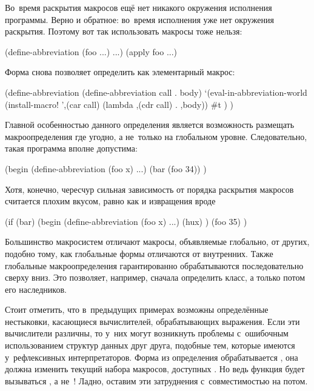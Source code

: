 Во~время раскрытия макросов ещё нет никакого окружения исполнения программы.
Верно и обратное: во~время исполнения уже нет окружения раскрытия. Поэтому вот
так использовать макросы тоже нельзя:

\begin{code:lisp}
(define-abbreviation (foo ...) ...)
(apply foo ...)
\end{code:lisp}

Форма  снова позволяет определить
 как элементарный макрос:

\begin{code:lisp}
(define-abbreviation (define-abbreviation call . body)
  `(eval-in-abbreviation-world
     (install-macro! ',(car call) (lambda ,(cdr call) . ,body))
     #t ) )
\end{code:lisp}

Главной особенностью данного определения является возможность размещать
макроопределения где угодно, а не~только на глобальном уровне. Следовательно,
такая программа вполне допустима:

\begin{code:lisp}
(begin (define-abbreviation (foo x) ...)
       (bar (foo 34)) )
\end{code:lisp}

Хотя, конечно, чересчур сильная зависимость от порядка раскрытия макросов
считается плохим вкусом, равно как и извращения вроде

\begin{code:lisp}
(if (bar) (begin (define-abbreviation (foo x) ...)
                 (hux) )
          (foo 35) )
\end{code:lisp}

Большинство макросистем отличают макросы, объявляемые глобально, от других,
подобно тому, как глобальные формы  отличаются от внутренних. Также
глобальные макроопределения гарантированно обрабатываются последовательно сверху
вниз. Это позволяет, например, сначала определить класс, а только потом его
наследников.

Стоит отметить, что в~предыдущих примерах возможны определённые нестыковки,
касающиеся вычислителей, обрабатывающих выражения. Если эти вычислители
различны, то у~них могут возникнуть проблемы с~ошибочным использованием
структур данных друг друга, подобные тем, которые имеются у~рефлексивных
интерпретаторов.  Форма  из
определения  обрабатывается , она
должна изменить текущий набора макросов, доступных . Но ведь
функция  будет вызываться , а не~!
Ладно, оставим эти затруднения с~совместимостью на потом.


